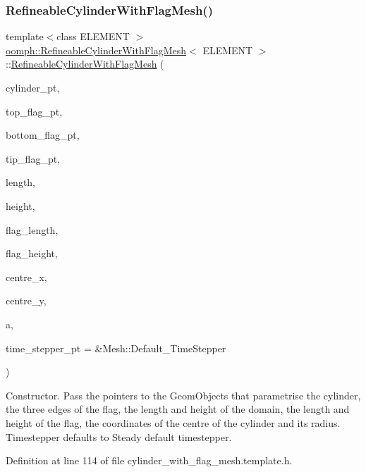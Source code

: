 \subsubsection{\texorpdfstring{Refineable\+Cylinder\+With\+Flag\+Mesh()}{RefineableCylinderWithFlagMesh()}}
{\footnotesize\ttfamily template$<$class E\+L\+E\+M\+E\+NT $>$ \\
\hyperlink{classoomph_1_1RefineableCylinderWithFlagMesh}{oomph\+::\+Refineable\+Cylinder\+With\+Flag\+Mesh}$<$ E\+L\+E\+M\+E\+NT $>$\+::\hyperlink{classoomph_1_1RefineableCylinderWithFlagMesh}{Refineable\+Cylinder\+With\+Flag\+Mesh} (\begin{DoxyParamCaption}\item[{Circle $\ast$}]{cylinder\+\_\+pt,  }\item[{Geom\+Object $\ast$}]{top\+\_\+flag\+\_\+pt,  }\item[{Geom\+Object $\ast$}]{bottom\+\_\+flag\+\_\+pt,  }\item[{Geom\+Object $\ast$}]{tip\+\_\+flag\+\_\+pt,  }\item[{const double \&}]{length,  }\item[{const double \&}]{height,  }\item[{const double \&}]{flag\+\_\+length,  }\item[{const double \&}]{flag\+\_\+height,  }\item[{const double \&}]{centre\+\_\+x,  }\item[{const double \&}]{centre\+\_\+y,  }\item[{const double \&}]{a,  }\item[{Time\+Stepper $\ast$}]{time\+\_\+stepper\+\_\+pt = {\ttfamily \&Mesh\+:\+:Default\+\_\+TimeStepper} }\end{DoxyParamCaption})\hspace{0.3cm}{\ttfamily [inline]}}



Constructor. Pass the pointers to the Geom\+Objects that parametrise the cylinder, the three edges of the flag, the length and height of the domain, the length and height of the flag, the coordinates of the centre of the cylinder and its radius. Timestepper defaults to Steady default timestepper. 



Definition at line 114 of file cylinder\+\_\+with\+\_\+flag\+\_\+mesh.\+template.\+h.

\mbox{\label{classoomph_1_1RefineableCylinderWithFlagMesh_a61744e809a7b7c74288273dfbc448751}} 
